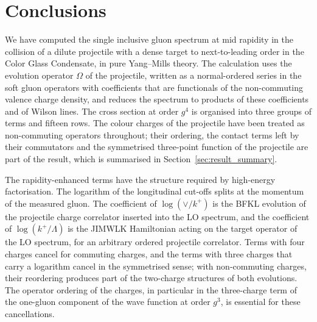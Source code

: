 \section{Conclusions}\label{sec:conclusions}

We have computed the single inclusive gluon spectrum at mid rapidity in the collision of a dilute projectile with a dense target to next-to-leading order in the Color Glass Condensate, in pure Yang--Mills theory. The calculation uses the evolution operator $\Omega$ of the projectile, written as a normal-ordered series in the soft gluon operators with coefficients that are functionals of the non-commuting valence charge density, and reduces the spectrum to products of these coefficients and of Wilson lines. The cross section at order $g^4$ is organised into three groups of terms and fifteen rows. The colour charges of the projectile have been treated as non-commuting operators throughout; their ordering, the contact terms left by their commutators and the symmetrised three-point function of the projectile are part of the result, which is summarised in Section~\ref{sec:result_summary}.

The rapidity-enhanced terms have the structure required by high-energy factorisation. The logarithm of the longitudinal cut-offs splits at the momentum of the measured gluon. The coefficient of $\log(\vee/k^+)$ is the BFKL evolution of the projectile charge correlator inserted into the LO spectrum, and the coefficient of $\log(k^+/\Lambda)$ is the JIMWLK Hamiltonian acting on the target operator of the LO spectrum, for an arbitrary ordered projectile correlator. Terms with four charges cancel for commuting charges, and the terms with three charges that carry a logarithm cancel in the symmetrised sense; with non-commuting charges, their reordering produces part of the two-charge structures of both evolutions. The operator ordering of the charges, in particular in the three-charge term of the one-gluon component of the wave function at order $g^3$, is essential for these cancellations.

